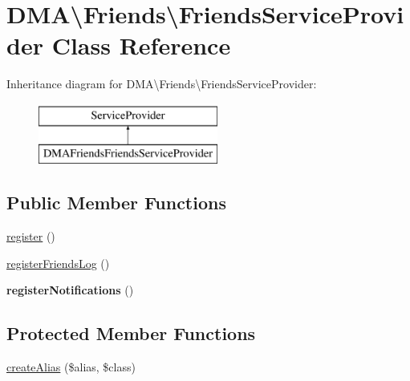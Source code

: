 \hypertarget{classDMA_1_1Friends_1_1FriendsServiceProvider}{\section{D\-M\-A\textbackslash{}Friends\textbackslash{}Friends\-Service\-Provider Class Reference}
\label{classDMA_1_1Friends_1_1FriendsServiceProvider}
}
Inheritance diagram for D\-M\-A\textbackslash{}Friends\textbackslash{}Friends\-Service\-Provider\-:\begin{figure}[H]
\begin{center}
\leavevmode
\includegraphics[height=2.000000cm]{df/d6d/classDMA_1_1Friends_1_1FriendsServiceProvider}
\end{center}
\end{figure}
\subsection*{Public Member Functions}
\begin{DoxyCompactItemize}
\item 
\hyperlink{classDMA_1_1Friends_1_1FriendsServiceProvider_a6a90d2cdc4c6b153b45764ba66e154ae}{register} ()
\item 
\hyperlink{classDMA_1_1Friends_1_1FriendsServiceProvider_a2d6ff7101ca6389c00e298f2d594a1df}{register\-Friends\-Log} ()
\item 
\hypertarget{classDMA_1_1Friends_1_1FriendsServiceProvider_a4a51f5a9c32c49373284c0b35f8dfd35}{{\bfseries register\-Notifications} ()}\label{classDMA_1_1Friends_1_1FriendsServiceProvider_a4a51f5a9c32c49373284c0b35f8dfd35}

\end{DoxyCompactItemize}
\subsection*{Protected Member Functions}
\begin{DoxyCompactItemize}
\item 
\hyperlink{classDMA_1_1Friends_1_1FriendsServiceProvider_acad52dc5020c640afed3c4fe82243051}{create\-Alias} (\$alias, \$class)
\end{DoxyCompactItemize}


